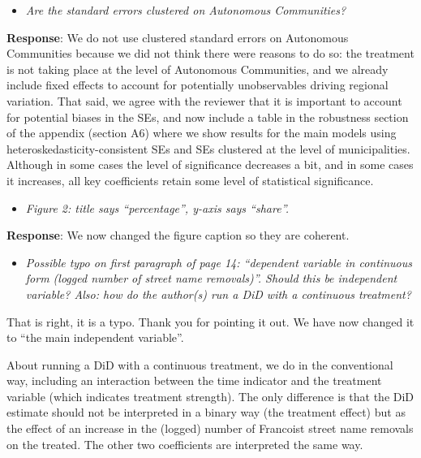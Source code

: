 \documentclass[12pt, a4paper, notitlepage]{article}
\begin{document}
\begin{itemize}
  \item \textit{Are the standard errors clustered on Autonomous Communities?}
\end{itemize}

\textbf{Response}: We do not use clustered standard errors on Autonomous Communities because we did not think there were reasons to do so: the treatment is not taking place at the level of Autonomous Communities, and we already include fixed effects to account for potentially unobservables driving regional variation. That said, we agree with the reviewer that it is important to account for potential biases in the SEs, and now include a table in the robustness section of the appendix (section A6) where we show results for the main models using heteroskedasticity-consistent SEs and SEs clustered at the level of municipalities.
Although in some cases the level of significance decreases a bit, and in some cases it increases, all key coefficients retain some level of statistical significance.

\begin{itemize}
  \item \textit{Figure 2: title says “percentage”, y-axis says “share”.}
\end{itemize}

\textbf{Response}: We now changed the figure caption so they are coherent.

\begin{itemize}
  \item \textit{Possible typo on first paragraph of page 14: “dependent variable in continuous form
  (logged number of street name removals)”. Should this be independent variable? Also: how do the author(s) run a DiD with a continuous treatment?}
\end{itemize}

That is right, it is a typo. Thank you for pointing it out. We have now changed it to ``the main independent variable''.

About running a DiD with a continuous treatment, we do in the conventional way, including an interaction between the time indicator and the treatment variable (which indicates treatment strength). The only difference is that the DiD estimate should not be interpreted in a binary way (the treatment effect) but as the effect of an increase in the (logged) number of Francoist street name removals on the treated. The other two coefficients are interpreted the same way.
\end{document}
